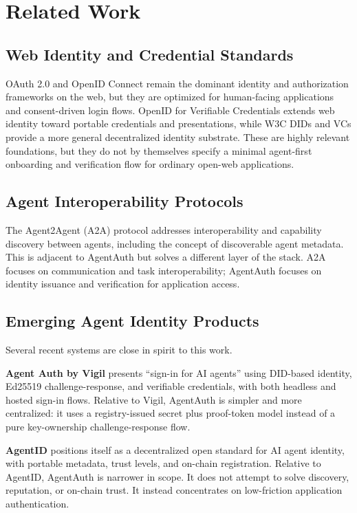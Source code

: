 \documentclass[11pt]{article}
\begin{document}
\section{Related Work}

\subsection{Web Identity and Credential Standards}

OAuth 2.0 and OpenID Connect remain the dominant identity and authorization frameworks on the web, but they are optimized for human-facing applications and consent-driven login flows. OpenID for Verifiable Credentials extends web identity toward portable credentials and presentations, while W3C DIDs and VCs provide a more general decentralized identity substrate. These are highly relevant foundations, but they do not by themselves specify a minimal agent-first onboarding and verification flow for ordinary open-web applications.

\subsection{Agent Interoperability Protocols}

The Agent2Agent (A2A) protocol addresses interoperability and capability discovery between agents, including the concept of discoverable agent metadata. This is adjacent to AgentAuth but solves a different layer of the stack. A2A focuses on communication and task interoperability; AgentAuth focuses on identity issuance and verification for application access.

\subsection{Emerging Agent Identity Products}

Several recent systems are close in spirit to this work.

\textbf{Agent Auth by Vigil} presents ``sign-in for AI agents'' using DID-based identity, Ed25519 challenge-response, and verifiable credentials, with both headless and hosted sign-in flows. Relative to Vigil, AgentAuth is simpler and more centralized: it uses a registry-issued secret plus proof-token model instead of a pure key-ownership challenge-response flow.

\textbf{AgentID} positions itself as a decentralized open standard for AI agent identity, with portable metadata, trust levels, and on-chain registration. Relative to AgentID, AgentAuth is narrower in scope. It does not attempt to solve discovery, reputation, or on-chain trust. It instead concentrates on low-friction application authentication.
\end{document}
